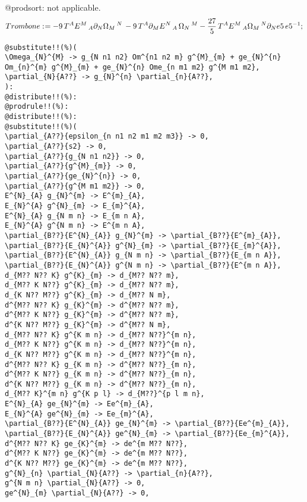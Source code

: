 \documentclass[11pt]{article}
\def\specialcolon{\mathrel{\mathop{:}}\hspace{-.5em}}
\begin{document}
@prodsort: not applicable.
\begin{dmath*}[compact, spread=2pt]
Trombone\specialcolon{}=  - 9\, {T}^{A} {E}^{M}\,_{A} {\partial}_{N}{{\Omega}_{M}\,^{N}}\,  - 9\, {T}^{A} {\partial}_{M}{{E}^{N}\,_{A}}\,  {\Omega}_{N}\,^{M} - \frac{27}{5}\, {T}^{A} {E}^{M}\,_{A} {\Omega}_{M}\,^{N} {\partial}_{N}{e5}\,  e5{}^{-1};
\end{dmath*}
{\color[named]{Blue}\begin{verbatim}
@substitute!!(%)(
\Omega_{N}^{M} -> g_{N n1 n2} Om^{n1 n2 m} g^{M}_{m} + ge_{N}^{n} Om_{n}^{m} g^{M}_{m} + ge_{N}^{n} Ome_{n m1 m2} g^{M m1 m2},
\partial_{N}{A??} -> g_{N}^{n} \partial_{n}{A??},
):
@distribute!!(%):
@prodrule!!(%):
@distribute!!(%):
@substitute!!(%)(
\partial_{A??}{epsilon_{n n1 n2 m1 m2 m3}} -> 0,
\partial_{A??}{s2} -> 0,
\partial_{A??}{g_{N n1 n2}} -> 0,
\partial_{A??}{g^{M}_{m}} -> 0,
\partial_{A??}{ge_{N}^{n}} -> 0,
\partial_{A??}{g^{M m1 m2}} -> 0,
E^{N}_{A} g_{N}^{m} -> E^{m}_{A},
E_{N}^{A} g^{N}_{m} -> E_{m}^{A},
E^{N}_{A} g_{N m n} -> E_{m n A},
E_{N}^{A} g^{N m n} -> E^{m n A},
\partial_{B??}{E^{N}_{A}} g_{N}^{m} -> \partial_{B??}{E^{m}_{A}},
\partial_{B??}{E_{N}^{A}} g^{N}_{m} -> \partial_{B??}{E_{m}^{A}},
\partial_{B??}{E^{N}_{A}} g_{N m n} -> \partial_{B??}{E_{m n A}},
\partial_{B??}{E_{N}^{A}} g^{N m n} -> \partial_{B??}{E^{m n A}},
d_{M?? N?? K} g^{K}_{m} -> d_{M?? N?? m},
d_{M?? K N??} g^{K}_{m} -> d_{M?? N?? m},
d_{K N?? M??} g^{K}_{m} -> d_{M?? N m},
d^{M?? N?? K} g_{K}^{m} -> d^{M?? N?? m},
d^{M?? K N??} g_{K}^{m} -> d^{M?? N?? m},
d^{K N?? M??} g_{K}^{m} -> d^{M?? N m},
d_{M?? N?? K} g^{K m n} -> d_{M?? N??}^{m n},
d_{M?? K N??} g^{K m n} -> d_{M?? N??}^{m n},
d_{K N?? M??} g^{K m n} -> d_{M?? N??}^{m n},
d^{M?? N?? K} g_{K m n} -> d^{M?? N??}_{m n},
d^{M?? K N??} g_{K m n} -> d^{M?? N??}_{m n},
d^{K N?? M??} g_{K m n} -> d^{M?? N??}_{m n},
d_{M?? K}^{m n} g^{K p l} -> d_{M??}^{p l m n},
E^{N}_{A} ge_{N}^{m} -> Ee^{m}_{A},
E_{N}^{A} ge^{N}_{m} -> Ee_{m}^{A},
\partial_{B??}{E^{N}_{A}} ge_{N}^{m} -> \partial_{B??}{Ee^{m}_{A}},
\partial_{B??}{E_{N}^{A}} ge^{N}_{m} -> \partial_{B??}{Ee_{m}^{A}},
d^{M?? N?? K} ge_{K}^{m} -> de^{m M?? N??},
d^{M?? K N??} ge_{K}^{m} -> de^{m M?? N??},
d^{K N?? M??} ge_{K}^{m} -> de^{m M?? N??},
g^{N}_{n} \partial_{N}{A??} -> \partial_{n}{A??},
g^{N m n} \partial_{N}{A??} -> 0,
ge^{N}_{m} \partial_{N}{A??} -> 0,

\end{verbatim}}
\end{document}
